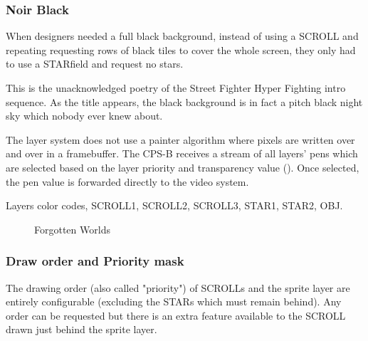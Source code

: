 \subsubsection{Noir Black}




When designers needed a full black background, instead of using a SCROLL and repeating requesting rows of black tiles to cover the whole screen, they only had to use a STARfield and request no stars. 

This is the unacknowledged poetry of the Street Fighter Hyper Fighting intro sequence. As the title appears, the black background is in fact a pitch black night sky which nobody ever knew about.

\begin{trivia}
The layer system does not use a painter algorithm where pixels are written over and over in a framebuffer. The CPS-B receives a stream of all layers' pens which are selected based on the layer priority and transparency value (). Once selected, the pen value is forwarded directly to the video system.
\end{trivia}


Layers color codes,  SCROLL1,  SCROLL2,  SCROLL3,  STAR1,  STAR2,  OBJ.

\vfill
\begin{figure}[!b]
 \caption*{Forgotten Worlds}%
 \end{figure}%
\pagebreak









\subsubsection{Draw order and Priority mask}\label{finalfight_trick}


The drawing order (also called "priority") of SCROLLs and the sprite layer are entirely configurable (excluding the STARs which must remain behind). Any order can be requested but there is an extra feature available to the SCROLL drawn just behind the sprite layer.

